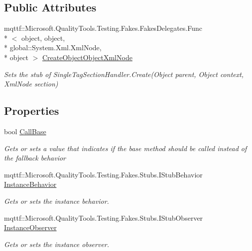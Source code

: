 \subsection*{Public Attributes}
\begin{DoxyCompactItemize}
\item 
mqttf\-::\-Microsoft.\-Quality\-Tools.\-Testing.\-Fakes.\-Fakes\-Delegates.\-Func\\*
$<$ object, object, \\*
global\-::\-System.\-Xml.\-Xml\-Node, \\*
object $>$ \hyperlink{class_system_1_1_configuration_1_1_fakes_1_1_stub_single_tag_section_handler_a8f4e1ca74e034e50d4a7fff759ba3a9a}{Create\-Object\-Object\-Xml\-Node}
\begin{DoxyCompactList}\small\item\em Sets the stub of Single\-Tag\-Section\-Handler.\-Create(\-Object parent, Object context, Xml\-Node section)\end{DoxyCompactList}\end{DoxyCompactItemize}
\subsection*{Properties}
\begin{DoxyCompactItemize}
\item 
bool \hyperlink{class_system_1_1_configuration_1_1_fakes_1_1_stub_single_tag_section_handler_a41218af82f1b8b7d8a9bf83527519507}{Call\-Base}
\begin{DoxyCompactList}\small\item\em Gets or sets a value that indicates if the base method should be called instead of the fallback behavior\end{DoxyCompactList}\item 
mqttf\-::\-Microsoft.\-Quality\-Tools.\-Testing.\-Fakes.\-Stubs.\-I\-Stub\-Behavior \hyperlink{class_system_1_1_configuration_1_1_fakes_1_1_stub_single_tag_section_handler_a4f18ac272bb2e558febd0ed167ea6829}{Instance\-Behavior}
\begin{DoxyCompactList}\small\item\em Gets or sets the instance behavior.\end{DoxyCompactList}\item 
mqttf\-::\-Microsoft.\-Quality\-Tools.\-Testing.\-Fakes.\-Stubs.\-I\-Stub\-Observer \hyperlink{class_system_1_1_configuration_1_1_fakes_1_1_stub_single_tag_section_handler_ab9f29d5d56e030489457f9547f30e1a1}{Instance\-Observer}
\begin{DoxyCompactList}\small\item\em Gets or sets the instance observer.\end{DoxyCompactList}\end{DoxyCompactItemize}



